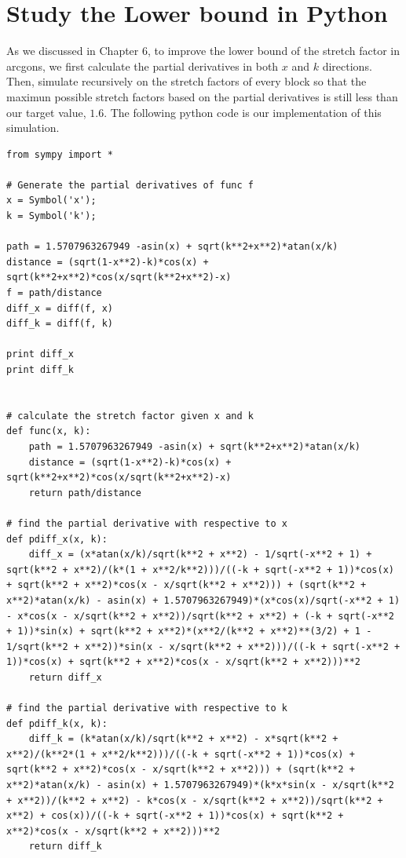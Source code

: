 \section{Study the Lower bound in Python}
As we discussed in Chapter 6, to improve the lower bound of the stretch factor in arcgons, we first calculate the partial derivatives in both $x$ and $k$ directions. Then, simulate recursively on the stretch factors of every block so that the maximun possible stretch factors based on the partial derivatives is still less than our target value, $1.6$. The following python code is our implementation of this simulation.
\begin{verbatim}
from sympy import *

# Generate the partial derivatives of func f
x = Symbol('x');
k = Symbol('k');

path = 1.5707963267949 -asin(x) + sqrt(k**2+x**2)*atan(x/k)
distance = (sqrt(1-x**2)-k)*cos(x) + sqrt(k**2+x**2)*cos(x/sqrt(k**2+x**2)-x)
f = path/distance
diff_x = diff(f, x)
diff_k = diff(f, k)

print diff_x
print diff_k


# calculate the stretch factor given x and k
def func(x, k):
	path = 1.5707963267949 -asin(x) + sqrt(k**2+x**2)*atan(x/k)
	distance = (sqrt(1-x**2)-k)*cos(x) + sqrt(k**2+x**2)*cos(x/sqrt(k**2+x**2)-x)
	return path/distance

# find the partial derivative with respective to x
def pdiff_x(x, k):
	diff_x = (x*atan(x/k)/sqrt(k**2 + x**2) - 1/sqrt(-x**2 + 1) + sqrt(k**2 + x**2)/(k*(1 + x**2/k**2)))/((-k + sqrt(-x**2 + 1))*cos(x) + sqrt(k**2 + x**2)*cos(x - x/sqrt(k**2 + x**2))) + (sqrt(k**2 + x**2)*atan(x/k) - asin(x) + 1.5707963267949)*(x*cos(x)/sqrt(-x**2 + 1) - x*cos(x - x/sqrt(k**2 + x**2))/sqrt(k**2 + x**2) + (-k + sqrt(-x**2 + 1))*sin(x) + sqrt(k**2 + x**2)*(x**2/(k**2 + x**2)**(3/2) + 1 - 1/sqrt(k**2 + x**2))*sin(x - x/sqrt(k**2 + x**2)))/((-k + sqrt(-x**2 + 1))*cos(x) + sqrt(k**2 + x**2)*cos(x - x/sqrt(k**2 + x**2)))**2
	return diff_x

# find the partial derivative with respective to k
def pdiff_k(x, k):
	diff_k = (k*atan(x/k)/sqrt(k**2 + x**2) - x*sqrt(k**2 + x**2)/(k**2*(1 + x**2/k**2)))/((-k + sqrt(-x**2 + 1))*cos(x) + sqrt(k**2 + x**2)*cos(x - x/sqrt(k**2 + x**2))) + (sqrt(k**2 + x**2)*atan(x/k) - asin(x) + 1.5707963267949)*(k*x*sin(x - x/sqrt(k**2 + x**2))/(k**2 + x**2) - k*cos(x - x/sqrt(k**2 + x**2))/sqrt(k**2 + x**2) + cos(x))/((-k + sqrt(-x**2 + 1))*cos(x) + sqrt(k**2 + x**2)*cos(x - x/sqrt(k**2 + x**2)))**2
	return diff_k


\end{verbatim}

